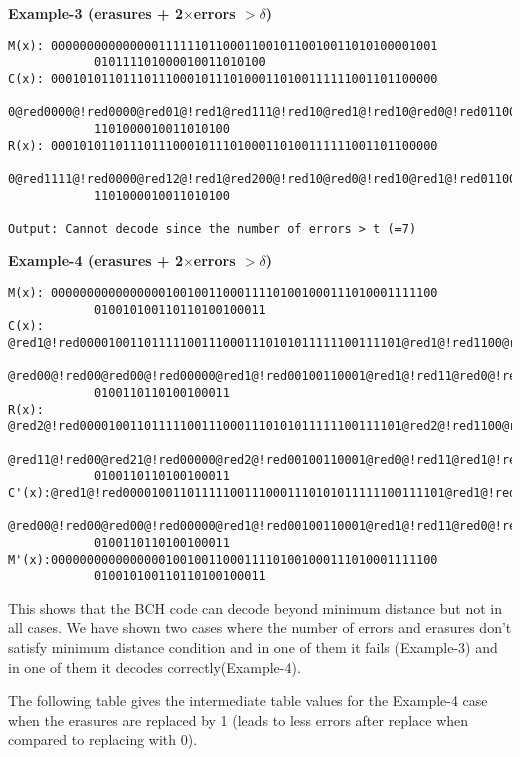 \documentclass[a4paper]{article}
\begin{document}
\textbf{Example-3 (erasures + 2$\times$errors $> \delta$)}
\begin{lstlisting}
M(x): 000000000000000111111011000110010110010011010100001001
			010111101000010011010100
C(x): 000101011011101110001011101000110100111111001101100000
			0@red0000@!red0000@red01@!red1@red111@!red10@red1@!red10@red0@!red011001011001001101010000100101011
			1101000010011010100
R(x): 000101011011101110001011101000110100111111001101100000
			0@red1111@!red0000@red12@!red1@red200@!red10@red0@!red10@red1@!red011001011001001101010000100101011
			1101000010011010100

Output: Cannot decode since the number of errors > t (=7)
\end{lstlisting}
\textbf{Example-4 (erasures + 2$\times$errors $> \delta$)}
\begin{lstlisting}
M(x): 000000000000000010010011000111101001000111010001111100
			010010100110110100100011
C(x): @red1@!red000010011011111001110001110101011111100111101@red1@!red1100@red0@!red00
			@red00@!red00@red00@!red00000@red1@!red00100110001@red1@!red11@red0@!red100100011101000111110001001
			0100110110100100011
R(x): @red2@!red000010011011111001110001110101011111100111101@red2@!red1100@red1@!red00
			@red11@!red00@red21@!red00000@red2@!red00100110001@red0@!red11@red1@!red100100011101000111110001001
			0100110110100100011
C'(x):@red1@!red000010011011111001110001110101011111100111101@red1@!red1100@red0@!red00
			@red00@!red00@red00@!red00000@red1@!red00100110001@red1@!red11@red0@!red100100011101000111110001001
			0100110110100100011
M'(x):000000000000000010010011000111101001000111010001111100
			010010100110110100100011
\end{lstlisting}
This shows that the BCH code can decode beyond minimum distance but not in all cases. We have shown two cases where the number of errors and erasures don't satisfy minimum distance condition and in one of them it fails (Example-3) and in one of them it decodes correctly(Example-4).

The following table gives the intermediate table values for the Example-4 case when the erasures are replaced by 1 (leads to less errors after replace when compared to replacing with 0).
\end{document}
